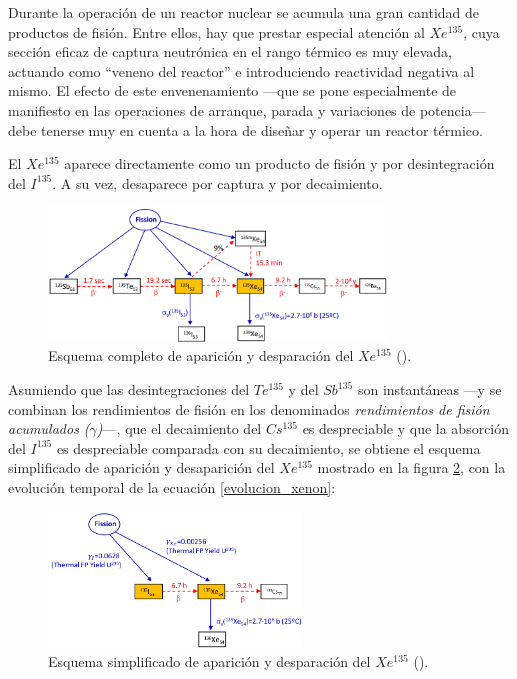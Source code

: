 Durante la operación de un reactor nuclear se acumula una gran cantidad de productos de fisión. Entre ellos, hay que prestar especial atención al $Xe^{135}$, cuya sección eficaz de captura neutrónica en el rango térmico es muy elevada, actuando como ``veneno del reactor'' e introduciendo reactividad negativa al mismo. El efecto de este envenenamiento ---que se pone especialmente de manifiesto en las operaciones de arranque, parada y variaciones de potencia--- debe tenerse muy en cuenta a la hora de diseñar y operar un reactor térmico.

El $Xe^{135}$ aparece directamente como un producto de fisión y por desintegración del $I^{135}$. A su vez, desaparece por captura y por decaimiento.

\begin{figure}[h]
  \centering
  \includegraphics[width=0.8\textwidth]{content/figures/esquema_xenon.png}
  \caption{Esquema completo de aparición y desparación del $Xe^{135}$ (\cite{apuntes_centrales}).}
  \label{fig:esquema_xenon}
\end{figure}

Asumiendo que las desintegraciones del $Te^{135}$ y del $Sb^{135}$ son instantáneas ---y se combinan los rendimientos de fisión en los denominados \textit{rendimientos de fisión acumulados ($\gamma$)}---, que el decaimiento del $Cs^{135}$ es despreciable y que la absorción del $I^{135}$ es despreciable comparada con su decaimiento, se obtiene el esquema simplificado de aparición y desaparición del $Xe^{135}$ mostrado en la figura \ref{fig:esquema_xenon_simplificado}, con la evolución temporal de la ecuación \ref{evolucion_xenon}:

\begin{figure}[!h]
  \centering
  \includegraphics[width=0.6\textwidth]{content/figures/esquema_xenon_simplificado.png}
  \caption{Esquema simplificado de aparición y desparación del $Xe^{135}$ (\cite{apuntes_centrales}).}
  \label{fig:esquema_xenon_simplificado}
\end{figure}

